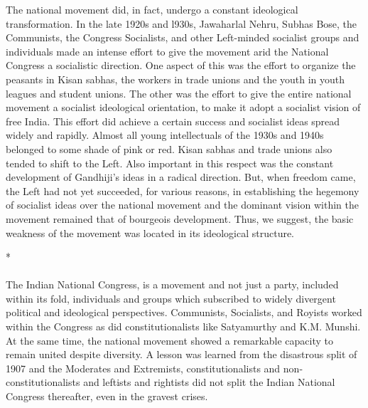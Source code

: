 The national movement did, in fact, undergo a constant ideological transformation. In the late 1920s and l930s, Jawaharlal Nehru, Subhas Bose, the Communists, the Congress Socialists, and other Left-minded socialist groups and individuals made an intense effort to give the movement arid the National Congress a socialistic direction. One aspect of this was the effort to organize the peasants in Kisan sabhas, the workers in trade unions and the youth in youth leagues and student unions. The other was the effort to give the entire national movement a socialist ideological orientation, to make it adopt a socialist vision of free India. This effort did achieve a certain success and socialist ideas spread widely and rapidly. Almost all young intellectuals of the 1930s and 1940s belonged to some shade of pink or red. Kisan sabhas and trade unions also tended to shift to the Left. Also important in this respect was the constant development of Gandhiji's ideas in a radical direction. But, when freedom came, the Left had not yet succeeded, for various reasons, in establishing the hegemony of socialist ideas over the national movement and the dominant vision within the movement remained that of bourgeois development. Thus, we suggest, the basic weakness of the movement was located in its ideological structure.

\begin{center}*\end{center}

\paragraph*{}
The Indian National Congress, is a movement and not just a party, included within its fold, individuals and groups which subscribed to widely divergent political and ideological perspectives. Communists, Socialists, and Royists worked within the Congress as did constitutionalists like Satyamurthy and K.M. Munshi. At the same time, the national movement showed a remarkable capacity to remain united despite diversity. A lesson was learned from the disastrous split of 1907 and the Moderates and Extremists, constitutionalists and non-constitutionalists and leftists and rightists did not split the Indian National Congress thereafter, even in the gravest crises.

